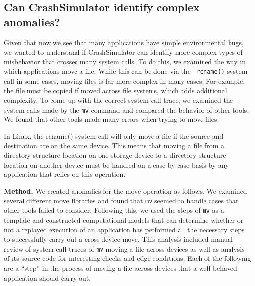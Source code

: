 
\subsection{Can CrashSimulator identify complex anomalies?}


Given that now we see that many applications have simple environmental bugs,
we wanted to understand if CrashSimulator can identify more complex types
of misbehavior that crosses many system calls.  To do this, we examined the
way in which applications move a file.  While this can be done via the {\tt
rename()} system call in some cases, moving files is far more complex in
many cases.  For example, the file must be copied if moved across file
systems, which adds additional complexity.  To come up with the correct
system call trace, we examined the system calls made by the {\tt mv}
command and compared the behavior of other tools.  We found that other
tools made many errors when trying to move files.

In Linux, the rename() system call will only move a file if the source and
destination are on the same device.  This means that moving a file from a
directory structure location on one storage device to a directory structure
location on another device must be handled on a case-by-case basis by any
application that relies on this operation.  

{\bf Method.}  We created anomalies for the move operation as follows.
We examined several different move libraries and found that {\tt mv} seemed
to handle cases that other tools failed to consider.  Following this, we 
used the steps of {\tt mv} as a template and
constructed computational models  that can determine whether or not a replayed
execution of an application has performed all the necessary steps to
successfully carry out a cross device move.  This analysis included manual
review of system call traces of {\tt mv} moving a file across devices as well as
analysis of its source code for interesting checks and edge conditions.  Each of
the following are a ``step'' in the process of moving a file across devices that
a well behaved application should carry out.


